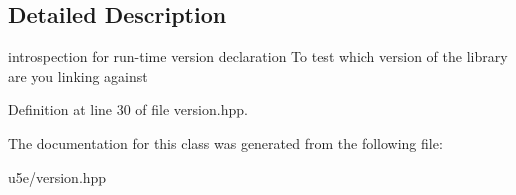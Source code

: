 \subsection{Detailed Description}
introspection for run-\/time version declaration To test which version of the library are you linking against 

Definition at line 30 of file version.\+hpp.



The documentation for this class was generated from the following file\+:\begin{DoxyCompactItemize}
\item 
u5e/version.\+hpp\end{DoxyCompactItemize}

